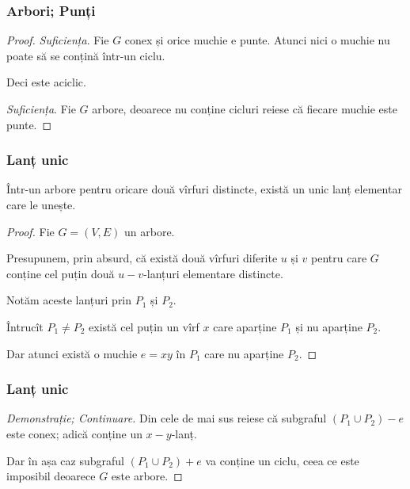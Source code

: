 \begin{frame}
  \frametitle{Arbori; Punți}

\begin{proof}
{\em Suficiența}. Fie $G$ conex și orice muchie e punte. Atunci nici o muchie 
nu poate să se conțină într-un ciclu. \pause

Deci este aciclic.\pause

{\em Suficiența}. Fie $G$ arbore, deoarece nu conține cicluri reiese că fiecare 
muchie este punte.
\end{proof}

\end{frame}



\begin{frame}
  \frametitle{Lanț unic}

\begin{theorem} 
Într-un arbore pentru oricare două vîrfuri distincte, există un unic lanț elementar care le unește.
\end{theorem}\pause

\begin{proof} 
Fie $G=(V,E)$ un arbore. \pause

Presupunem, prin absurd, că există două vîrfuri diferite $u$ și $v$ pentru care $G$ conține cel puțin două $u-v$-lanțuri elementare distincte.\pause

Notăm aceste lanțuri prin $P_1$ și $P_2$.\pause

Întrucît $P_1\neq P_2$ există cel puțin un vîrf $x$ care aparține $P_1$ și nu aparține $P_2$.\pause

Dar atunci există o muchie $e=xy$ în $P_1$ care nu aparține $P_2$. 

\end{proof}

\end{frame}


\begin{frame}
  \frametitle{Lanț unic}

\begin{proof}[Demonstrație; Continuare]

Din cele de mai sus reiese că subgraful $(P_1\cup P_2)-e$ este conex; adică conține un $x-y$-lanț. \pause

Dar în așa caz subgraful $(P_1\cup P_2)+e$ va conține un ciclu, ceea ce este imposibil deoarece $G$ este arbore. 
\end{proof}

\end{frame}


